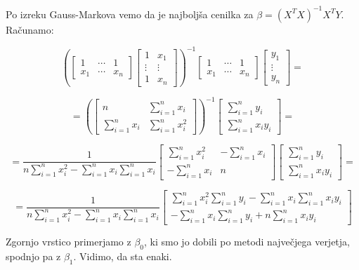 \documentclass{article}
\begin{document}
Po izreku Gauss-Markova vemo da je najboljša cenilka za $\beta = (X^TX)^{-1}X^TY$. Računamo:

\begin{equation*}
\left(
\begin{bmatrix}
1 & \cdots & 1\\
x_1 & \cdots & x_n
\end{bmatrix}
\begin{bmatrix}
1 & x_1\\
\vdots &\vdots \\
1 & x_n
\end{bmatrix}
\right)^{-1}
\begin{bmatrix}
1 & \cdots & 1\\
x_1 & \cdots & x_n
\end{bmatrix}
\begin{bmatrix}
y_1\\
\vdots\\
y_n
\end{bmatrix}
=
\end{equation*}

\begin{equation*}
=
\left(
\begin{bmatrix}
n & \sum_{i=1}^nx_i\\
\sum_{i=1}^nx_i & \sum_{i=1}^nx_i^2
\end{bmatrix}
\right)^{-1}
\begin{bmatrix}
\sum_{i=1}^ny_i\\
\sum_{i=1}^nx_iy_i
\end{bmatrix}
=
\end{equation*}

\begin{equation*}
=
\frac{1}{n\sum_{i=1}^nx_i^2-\sum_{i=1}^nx_i\sum_{i=1}^nx_i}
\begin{bmatrix}
\sum_{i=1}^nx_i^2 & -\sum_{i=1}^nx_i\\
-\sum_{i=1}^nx_i & n
\end{bmatrix}
\begin{bmatrix}
\sum_{i=1}^ny_i\\
\sum_{i=1}^nx_iy_i
\end{bmatrix}
=
\end{equation*}

\begin{equation*}
=
\frac{1}{n\sum_{i=1}^nx_i^2-\sum_{i=1}^nx_i\sum_{i=1}^nx_i}
\begin{bmatrix}
\sum_{i=1}^nx_i^2\sum_{i=1}^ny_i - \sum_{i=1}^nx_i\sum_{i=1}^nx_iy_i\\
-\sum_{i=1}^nx_i\sum_{i=1}^ny_i+n\sum_{i=1}^nx_iy_i
\end{bmatrix}
\end{equation*}

Zgornjo vrstico primerjamo z $\beta_0$, ki smo jo dobili po metodi največjega verjetja, spodnjo pa z $\beta_1$. Vidimo, da sta enaki.
\end{document}
